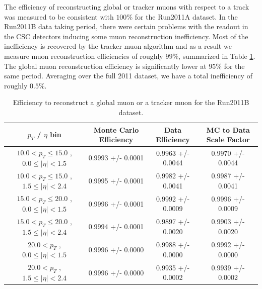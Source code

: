 \label{app:efficiency_studies_muon}

The efficiency of reconstructing global or tracker muons with respect to a track was measured to be consistent with
$100\%$ for the Run2011A dataset. In the Run2011B data taking period, there were certain problems with the readout 
in the CSC detectors inducing some muon reconstruction inefficiency. Most of the inefficiency is recovered by the 
tracker muon algorithm and as a result we measure muon reconstruction efficiencies of roughly $99\%$, summarized
in Table \ref{tab:eff_mu_reco_Run2011B}. The global muon reconstruction efficiency is significantly lower at $95\%$ for the same period.
Averaging over the full 2011 dataset, we have a total inefficiency of roughly $0.5\%$. 

 \begin{table}[!ht]
 \begin{center} 
 \begin{tabular}{|c|c|c|c|}
 \hline
 $p_{T}$ / $\eta$ bin    &  Monte Carlo Efficiency    &  Data Efficiency   &  MC to Data Scale Factor \\   \hline           
$ 10.0 < p_{T} \le  15.0$ , $  0.0  \le |\eta| <   1.5$   &       0.9993 +/- 0.0001   &       0.9963 +/- 0.0044   &       0.9970 +/- 0.0044   \\   
\hline
$ 10.0 < p_{T} \le  15.0$ , $  1.5  \le |\eta| <   2.4$   &       0.9995 +/- 0.0001   &       0.9982 +/- 0.0041   &       0.9987 +/- 0.0041   \\   
\hline
$ 15.0 < p_{T} \le  20.0$ , $  0.0  \le |\eta| <   1.5$   &       0.9996 +/- 0.0001   &       0.9992 +/- 0.0009   &       0.9996 +/- 0.0009   \\   
\hline
$ 15.0 < p_{T} \le  20.0$ , $  1.5  \le |\eta| <   2.4$   &       0.9994 +/- 0.0001   &       0.9897 +/- 0.0020   &       0.9903 +/- 0.0020   \\   
\hline
$ 20.0 < p_{T} $ , $  0.0  \le |\eta| <   1.5$   &       0.9996 +/- 0.0000   &       0.9988 +/- 0.0000   &       0.9992 +/- 0.0000   \\   
\hline
$ 20.0 < p_{T} $ , $  1.5  \le |\eta| <   2.4$   &       0.9996 +/- 0.0000   &       0.9935 +/- 0.0002   &       0.9939 +/- 0.0002   \\   
\hline
\end{tabular}
\caption{Efficiency to reconstruct a global muon or a tracker muon for the Run2011B dataset.}
\label{tab:eff_mu_reco_Run2011B}
\end{center}
\end{table}


